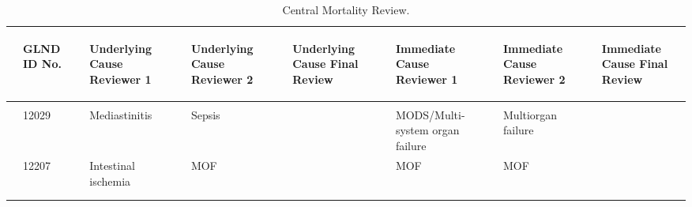 \documentclass[dvips,10pt]{article}
\begin{document}
\begin{table}[t]
\caption
{ Central Mortality Review. }
\begin{center}
\begin{tabular}{ @{}l@{}
@{}l@{}@{}p{1.5em}@{}@{}p{1.0in}@{}@{}p{1.5em}@{}@{}p{1.0in}@{}@{}p{1.5em}@{}@{}p{1.0in}@{}@{}p{1.5em}@{}@{}p{1.0in}@{}@{}p{1.5em}@{}@{}p{1.0in}@{}@{}p{1.5em}@{}@{}p{1.0in}@{}
}
\hline

& \parbox{6em}{\begin{center}GLND ID No.\end{center}} && \parbox{6em}{\begin{center}Underlying Cause Reviewer 1\end{center}} && \parbox{6em}{\begin{center}Underlying Cause Reviewer 2\end{center}} && \parbox{6em}{\begin{center}Underlying Cause Final Review\end{center}} && \parbox{6em}{\begin{center}Immediate Cause Reviewer 1\end{center}} && \parbox{6em}{\begin{center}Immediate Cause Reviewer 2\end{center}} && \parbox{6em}{\begin{center}Immediate Cause Final Review\end{center}} \\

\hline

\\
& 12029 && Mediastinitis && Sepsis &&  && MODS/Multi-system organ failure && Multiorgan failure &&  \\
& 12207 && Intestinal ischemia && MOF &&  && MOF && MOF &&  \\
\\
\hline \\

\end{tabular}

\end{center}
 \end{table}
\end{document}
